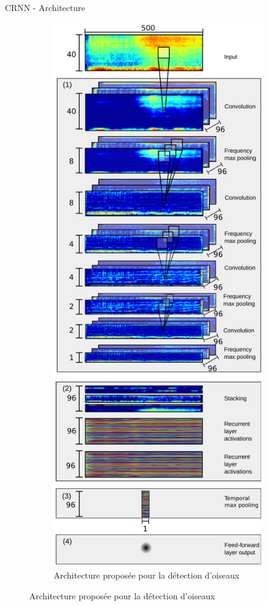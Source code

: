 \documentclass[compress,xcolor=table]{beamer}
\begin{document}
\begin{frame}{CRNN - Architecture}
\begin{figure}[ht]
\begin{subfigure}[b]{0.45\textwidth}
            \label{fig:CRNN.architecture.generic}
        \end{subfigure}
        \hfill
        \begin{subfigure}[b]{0.45\textwidth}
            \centering
            \includegraphics[width=\textwidth,height=0.8\textheight,keepaspectratio]{../images/models/CRNN.architecture.birds.pdf}
            \caption{Architecture proposée pour la détection d'oiseaux}
            \label{fig:CRNN.architecture.birds}
        \end{subfigure}
    \end{figure}

\end{frame}
\end{document}
